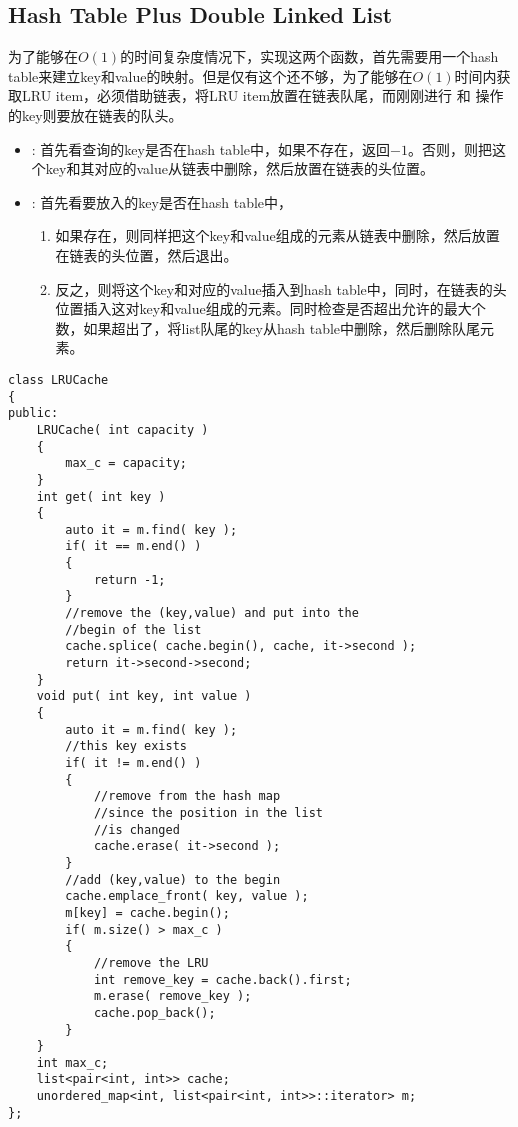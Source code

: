 \subsection{Hash Table Plus Double Linked List}
为了能够在$O(1)$的时间复杂度情况下，实现这两个函数，首先需要用一个hash table来建立key和value的映射。但是仅有这个还不够，为了能够在$O(1)$时间内获取LRU item，必须借助链表，将LRU item放置在链表队尾，而刚刚进行  和  操作的key则要放在链表的队头。
\begin{itemize}
    \item {}: 首先看查询的key是否在hash table中，如果不存在，返回$-1$。否则，则把这个key和其对应的value从链表中删除，然后放置在链表的头位置。
    \item {}: 首先看要放入的key是否在hash table中，
    \begin{enumerate}
        \item 如果存在，则同样把这个key和value组成的元素从链表中删除，然后放置在链表的头位置，然后退出。
        \item 反之，则将这个key和对应的value插入到hash table中，同时，在链表的头位置插入这对key和value组成的元素。同时检查是否超出允许的最大个数，如果超出了，将list队尾的key从hash table中删除，然后删除队尾元素。
    \end{enumerate}
\end{itemize}

\setcounter{lstlisting}{0}
\begin{lstlisting}[style=customc, caption={Hash Table With Linked List}]
class LRUCache
{
public:
    LRUCache( int capacity )
    {
        max_c = capacity;
    }
    int get( int key )
    {
        auto it = m.find( key );
        if( it == m.end() )
        {
            return -1;
        }
        //remove the (key,value) and put into the
        //begin of the list
        cache.splice( cache.begin(), cache, it->second );
        return it->second->second;
    }
    void put( int key, int value )
    {
        auto it = m.find( key );
        //this key exists
        if( it != m.end() )
        {
            //remove from the hash map
            //since the position in the list
            //is changed
            cache.erase( it->second );
        }
        //add (key,value) to the begin
        cache.emplace_front( key, value );
        m[key] = cache.begin();
        if( m.size() > max_c )
        {
            //remove the LRU
            int remove_key = cache.back().first;
            m.erase( remove_key );
            cache.pop_back();
        }
    }
    int max_c;
    list<pair<int, int>> cache;
    unordered_map<int, list<pair<int, int>>::iterator> m;
};
\end{lstlisting}
